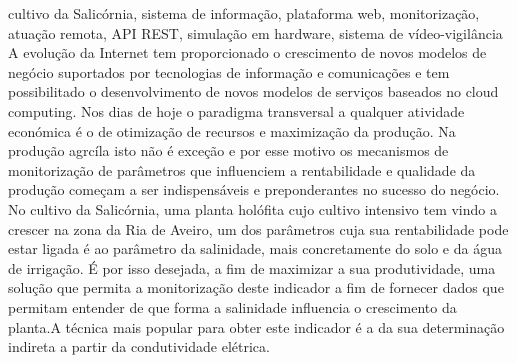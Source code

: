 \documentclass[11pt,twoside,a4paper]{report}
\begin{document}
\TitlePage
	\vspace*{55mm}
	{cultivo da Salicórnia, sistema de informação, plataforma web,  monitorização, atuação remota, API REST, simulação em hardware, sistema de vídeo-vigilância}
  	\vspace*{5mm}
       {A evolução da Internet tem proporcionado o crescimento de novos modelos de negócio suportados por tecnologias de informação e comunicações e tem possibilitado o desenvolvimento de novos modelos de serviços baseados no cloud computing. Nos dias de hoje o paradigma transversal a qualquer atividade económica é o de otimização de recursos e maximização da produção. Na produção agrcíla isto não é exceção e por esse motivo os mecanismos de monitorização de parâmetros que influenciem a rentabilidade e qualidade da produção começam a ser indispensáveis e preponderantes no sucesso do negócio. No cultivo da Salicórnia, uma planta holófita cujo cultivo intensivo tem vindo a crescer na zona da Ria de Aveiro, um dos parâmetros cuja sua rentabilidade pode estar ligada é ao parâmetro da salinidade, mais concretamente do solo e da água de irrigação. É por isso desejada, a fim de maximizar a sua produtividade, uma solução que permita a monitorização deste indicador a fim de fornecer dados que permitam entender de que forma a salinidade influencia o crescimento da planta.A técnica mais popular para obter este indicador é a da sua determinação indireta a partir da condutividade elétrica.}
       
       
       
       
\end{document}
